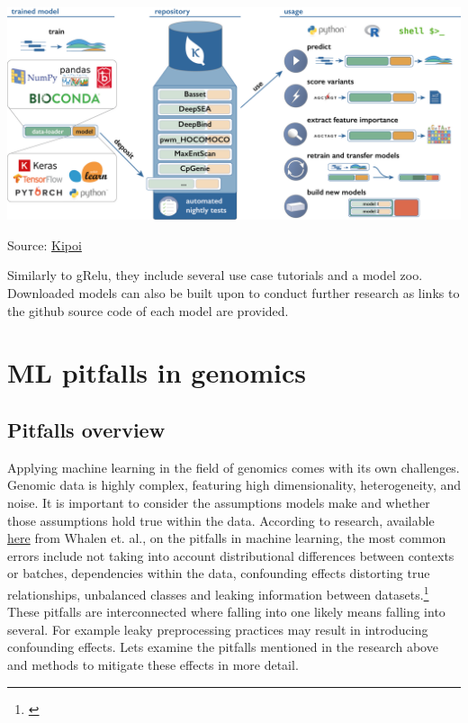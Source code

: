 \documentclass[
]{book}
\begin{document}
\includegraphics{images/kipoi.png}

Source: \href{https://kipoi.org/docs/}{Kipoi}

Similarly to gRelu, they include several use case tutorials and a model zoo. Downloaded models can also be built upon to conduct further research as links to the github source code of each model are provided.

\part{ML pitfalls in genomics}\label{part-ml-pitfalls-in-genomics}

\chapter{Pitfalls overview}\label{pitfalls-overview}

Applying machine learning in the field of genomics comes with its own challenges. Genomic data is highly complex, featuring high dimensionality, heterogeneity, and noise. It is important to consider the assumptions models make and whether those assumptions hold true within the data. According to research, available \href{https://www.nature.com/articles/s41576-021-00434-9}{here} from Whalen et. al., on the pitfalls in machine learning, the most common errors include not taking into account distributional differences between contexts or batches, dependencies within the data, confounding effects distorting true relationships, unbalanced classes and leaking information between datasets.\footnote{\citet{whalen2022}} These pitfalls are interconnected where falling into one likely means falling into several. For example leaky preprocessing practices may result in introducing confounding effects. Lets examine the pitfalls mentioned in the research above and methods to mitigate these effects in more detail.
\end{document}
